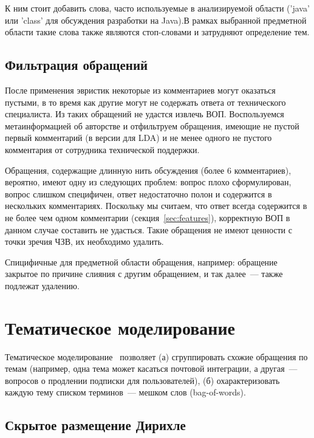 К ним стоит добавить слова, часто используемые в анализируемой области ('java' или 'class' для обсуждения разработки на Java).В рамках выбранной предметной области такие слова также являются стоп-словами и затрудняют определение тем.

\subsection{Фильтрация обращений}
\label{subsec:ticketfilter}

После применения эвристик некоторые из комментариев могут оказаться пустыми, в то время как другие могут не содержать ответа от технического специалиста. Из таких обращений не удастся извлечь ВОП. Воспользуемся метаинформацией об авторстве и отфильтруем обращения, имеющие не пустой первый комментарий (в версии для LDA) и не менее одного не пустого комментария от сотрудника технической поддержки.

Обращения, содержащие длинную нить обсуждения (более 6 комментариев), вероятно, имеют одну из следующих проблем: вопрос плохо сформулирован, вопрос слишком специфичен, ответ недостаточно полон и содержится в нескольких комментариях. Поскольку мы считаем, что ответ всегда содержится в не более чем одном комментарии (секция~\ref{sec:features}), корректную ВОП в данном случае составить не удасться. Такие обращения не имеют ценности с точки зречия ЧЗВ, их необходимо удалить.

Спицифичные для предметной области обращения, например: обращение закрытое по причине слияния с другим обращением, и так далее~--- также подлежат удалению.

\section{Тематическое моделирование}
\label{sec:topicmodeling}

Тематическое моделирование~\cite{TM} позволяет (а) сгруппировать схожие обращения по темам (например, одна тема может касаться почтовой интеграции, а другая~--- вопросов о продлении подписки для пользователей), (б) охарактеризовать каждую тему списком терминов~--- мешком слов (\mbox{bag-of-words}).

\subsection{Скрытое размещение Дирихле}
\label{subsec:lda}

